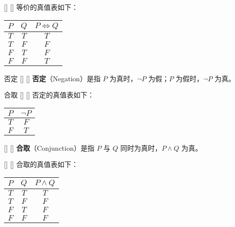 \documentclass[UTF8]{ctexart}
\begin{document}
        \begin{ppt}
            []
            {}
            []
            []
            等价的真值表如下：
            \begin{center}
                \begin{tabular}{c|c|c}
                    $P$ & $Q$ & $P \Leftrightarrow Q$ \\
                    \hline
                    $T$ & $T$ & $T$ \\
                    $T$ & $F$ & $F$ \\
                    $F$ & $T$ & $F$ \\
                    $F$ & $F$ & $T$ \\
                \end{tabular}
            \end{center}
       \end{ppt}

        \begin{dfn}
            []
            {否定}
            []
            []
            \textbf{否定}（Negation）是指 $P$ 为真时，$\neg P$ 为假；$P$ 为假时，$\neg P$ 为真。
        \end{dfn}

        \begin{ppt}
            []
            {合取}
            []
            []
            否定的真值表如下：
            \begin{center}
                \begin{tabular}{c|c}
                    $P$ & $\neg P$ \\
                    \hline
                    $T$ & $F$ \\
                    $F$ & $T$ \\
                \end{tabular}
            \end{center}
        \end{ppt}

        \begin{dfn}
            []
            {}
            []
            []
			\textbf{合取}（Conjunction）是指 $P$ 与 $Q$ 同时为真时，$P \land Q$ 为真。
		\end{dfn}

		\begin{ppt}
            []
            {}
            []
            []
			合取的真值表如下：
			\begin{center}
				\begin{tabular}{c|c|c}
					$P$ & $Q$ & $P \land Q$ \\
					\hline
					$T$ & $T$ & $T$ \\
					$T$ & $F$ & $F$ \\
					$F$ & $T$ & $F$ \\
					$F$ & $F$ & $F$ \\
				\end{tabular}
			\end{center}
		\end{ppt}
\end{document}
